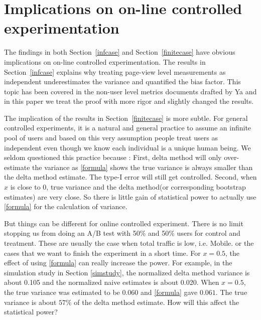 \documentclass[12pt,letterpaper]{article}
\begin{document}
\section{Implications on on-line controlled experimentation}\label{implication}
The findings in both Section~\ref{infcase} and Section~\ref{finitecase} have obvious implications on on-line controlled experimentation. The results in Section~\ref{infcase} explains why treating page-view level measurements as independent underestimates the variance and quantified the bias factor. This topic has been covered in the non-user level metrics documents drafted by Ya and in this paper we treat the proof with more rigor and slightly changed the results.  

The implication of the results in Section~\ref{finitecase} is more subtle. For general controlled experiments, it is a natural and general practice to assume an infinite pool of users and based on this very assumption people treat users as independent even though we know each individual is a unique human being. We seldom questioned this practice because : First, delta method will only over-estimate the variance as \ref{formula} shows the true variance is always smaller than the delta method estimate. The type-I error will still get controlled. Second, when $x$ is close to 0, true variance and the delta method(or corresponding bootstrap estimates) are very close. So there is little gain of statistical power to actually use \ref{formula} for the calculation of variance.

 But things can be different for online controlled experiment. There is no limit stopping us from doing an A/B test with 50\% and 50\% users for control and treatment. These are usually the case when total traffic is low, i.e. Mobile. or the cases that we want to finish the experiment in a short time. For $x=0.5$, the effect of using \ref{formula} can really increase the power. For example, in the simulation study in Section \ref{simstudy}, the normalized delta method variance is about 0.105 and the normalized naive estimates is about 0.020. When $x=0.5$, the true variance was estimated to be $0.060$ and \ref{formula} gave $0.061$.
The true variance is about $57\%$ of the delta method estimate. How will this affect the statistical power?
\end{document}
